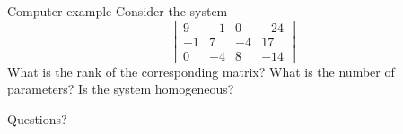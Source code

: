 \documentclass{beamer}
\begin{document}
\begin{frame}{Computer example}
  Consider the system
  \begin{equation*}
    \left[
      \begin{array}{rrr|r}
        9 & -1 & 0 & -24  \\
        -1 & 7 & -4 & 17   \\
        0 & -4 & 8 & -14 
      \end{array}\right] 
  \end{equation*}
  What is the rank of the corresponding matrix?
  What is the number of parameters?
  Is the system homogeneous?
\end{frame}

\begin{frame}
  Questions?
\end{frame}
\end{document}
